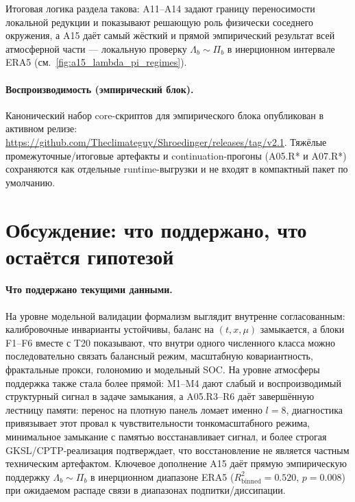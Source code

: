 \documentclass[11pt,a4paper]{article}
\theoremstyle{definition}
\theoremstyle{plain}
\theoremstyle{remark}
\begin{document}
Итоговая логика раздела такова: A11--A14 задают границу переносимости локальной редукции и показывают решающую роль физически соседнего окружения, а A15 даёт самый жёсткий и прямой эмпирический результат всей атмосферной части --- локальную проверку \(\Lambda_b\sim\Pi_b\) в инерционном интервале ERA5 (см.\ \cref{fig:a15_lambda_pi_regimes}).

\paragraph{Воспроизводимость (эмпирический блок).}
Канонический набор core-скриптов для эмпирического блока опубликован в активном релизе:
\url{https://github.com/Theclimateguy/Shroedinger/releases/tag/v2.1}.
Тяжёлые промежуточные/итоговые артефакты и continuation-прогоны (A05.R* и A07.R*) сохраняются как отдельные runtime-выгрузки и не входят в компактный пакет по умолчанию.

\section{Обсуждение: что поддержано, что остаётся гипотезой}
\label{sec:discussion}

\paragraph{Что поддержано текущими данными.}
На уровне модельной валидации формализм выглядит внутренне согласованным:
калибровочные инварианты устойчивы, баланс на $(t,x,\mu)$ замыкается,
а блоки F1--F6 вместе с T20 показывают, что внутри одного численного класса можно последовательно связать балансный режим,
масштабную ковариантность, фрактальные прокси, голономию и модельный SOC.
На уровне атмосферы поддержка также стала более прямой:
M1--M4 дают слабый и воспроизводимый структурный сигнал в задаче замыкания,
а A05.R3--R6 даёт завершённую лестницу памяти: перенос на плотную панель ломает именно $l=8$,
диагностика привязывает этот провал к чувствительности тонкомасштабного режима, минимальное замыкание с памятью восстанавливает сигнал,
и более строгая GKSL/CPTP-реализация подтверждает, что восстановление не является частным техническим артефактом.
Ключевое дополнение A15 даёт прямую эмпирическую поддержку \(\Lambda_b\sim\Pi_b\) в инерционном диапазоне ERA5
(\(R^2_{\mathrm{binned}}=0.520\), \(p=0.008\)) при ожидаемом распаде связи в диапазонах подпитки/диссипации.
\end{document}
